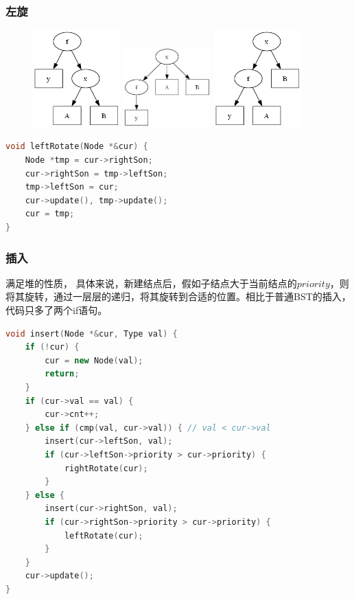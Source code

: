 \documentclass[utf8]{ctexbeamer}
\begin{document}
    \begin{frame}[fragile]
        \frametitle{左旋}
        \begin{figure}
            \includegraphics[width=0.3\textwidth]{images/left_rotate0.png}
            \includegraphics[width=0.3\textwidth]{images/left_rotate1.png}
            \includegraphics[width=0.3\textwidth]{images/left_rotate2.png}
        \end{figure}
    
        \begin{lstlisting}[language=c++]
void leftRotate(Node *&cur) {
    Node *tmp = cur->rightSon;
    cur->rightSon = tmp->leftSon;
    tmp->leftSon = cur;
    cur->update(), tmp->update();
    cur = tmp;
}
        \end{lstlisting}
    \end{frame}

    \begin{frame}[fragile]
        \frametitle{插入}满足堆的性质，
        具体来说，新建结点后，假如子结点大于当前结点的$priority$，则将其旋转，通过一层层的递归，将其旋转到合适的位置。相比于普通BST的插入，代码只多了两个if语句。
        \begin{lstlisting}[language=c++]
void insert(Node *&cur, Type val) {
    if (!cur) {
        cur = new Node(val);
        return;
    }
    if (cur->val == val) {
        cur->cnt++;
    } else if (cmp(val, cur->val)) { // val < cur->val
        insert(cur->leftSon, val);
        if (cur->leftSon->priority > cur->priority) {
            rightRotate(cur);
        }
    } else {
        insert(cur->rightSon, val);
        if (cur->rightSon->priority > cur->priority) {
            leftRotate(cur);
        }
    }
    cur->update();
}
        \end{lstlisting}
    \end{frame}
\end{document}
